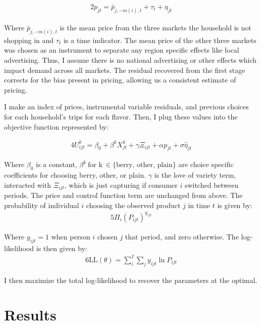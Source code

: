 \documentclass[11pt]{article}
\theoremstyle{definition}
\theoremstyle{remark}
\begin{document}
    \begin{alignat*}{2}
      p_{jt} = \bar{p}_{j,-m(i),t} + \tau_t + \eta_{jt}
    \end{alignat*}

    Where $\bar{p}_{j,-m(i),t}$ is the mean price from the three markets the household is not shopping in and $\tau_t$ is a time indicator. The mean price of the other three markets was chosen as an instrument to separate any region specific effects like local advertising. Thus, I assume there is no national advertising or other effects which impact demand across all markets. The residual recovered from the first stage corrects for the bias present in pricing, allowing us a consistent estimate of pricing.

I make an index of prices, instrumental variable residuals, and previous choices for each household's trips for each flavor. Then, I plug these values into the objective function represented by:

\begin{alignat*}{4}
  U^k_{ijt} = \beta_0 +  \beta^kX^k_{jt} + \gamma\Xi_{ijt} + \alpha p_{jt} + \sigma\hat{\eta}_{jt}
\end{alignat*}

Where $\beta_0$ is a constant, $\beta^k \ \text{for k} \ \in \{\text{berry, other, plain}\}$ are choice specific coefficients for choosing berry, other, or plain. $\gamma$ is the love of variety term, interacted with $\Xi_{ijt}$, which is just capturing if consumer $i$ switched between periods. The price and control function term are unchanged from above. The probability of individual $i$ choosing the observed product $j$ in time $t$ is given by:
\begin{alignat*}{5}
  \Pi_i(P_{ijt})^{y_{ijt}}
\end{alignat*}

Where $y_{ijt} = 1$ when person $i$ chosen $j$ that period, and zero otherwise. The log-likelihood is then given by:
\begin{alignat*}{6}
  \text{LL}(\theta) = \sum_i^I\sum_jy_{ijt}\ln P_{ijt}
\end{alignat*}

I then maximize the total log-likelihood to recover the parameters at the optimal.

\section{Results}
\end{document}
